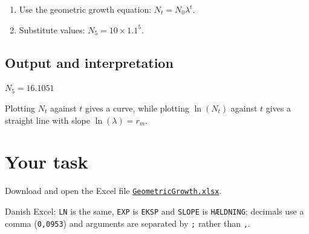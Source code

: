 \documentclass[
  a4paper]{book}
\providecommand{\tightlist}{%
  \setlength{\itemsep}{0pt}\setlength{\parskip}{0pt}}
\begin{document}
\begin{enumerate}
\def\labelenumi{\arabic{enumi}.}
\tightlist
\item
  Use the geometric growth equation: \(N_t = N_0 \lambda^t\).
\item
  Substitute values: \(N_5 = 10 \times 1.1^5\).
\end{enumerate}

\subsection{Output and interpretation}\label{output-and-interpretation-1}

\(N_5 = 16.1051\)

Plotting \(N_t\) against \(t\) gives a curve, while plotting \(\ln(N_t)\) against \(t\) gives a straight line with slope \(\ln(\lambda) = r_m\).

\section{Your task}\label{your-task-2}

Download and open the Excel file \href{https://www.dropbox.com/s/xxx05sckvop5i52/GeometricGrowth.xlsx?dl=1}{\texttt{GeometricGrowth.xlsx}}.

Danish Excel: \texttt{LN} is the same, \texttt{EXP} is \texttt{EKSP} and \texttt{SLOPE} is \texttt{HÆLDNING}; decimals use a comma (\texttt{0,0953}) and arguments are separated by \texttt{;} rather than \texttt{,}.
\end{document}
